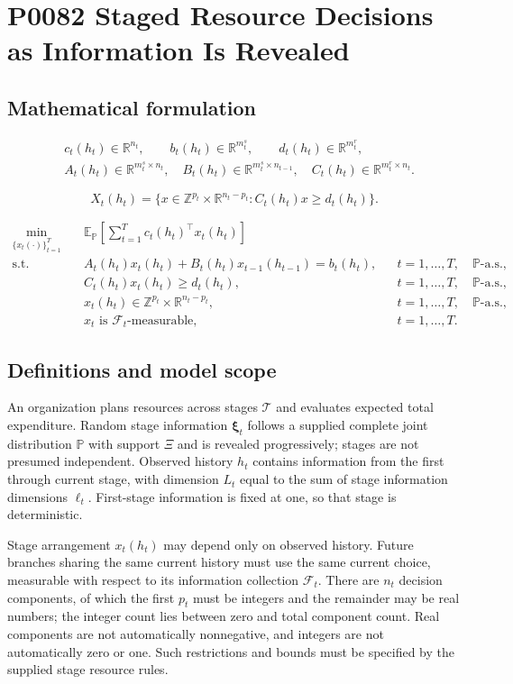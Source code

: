 \documentclass[10pt]{article}
\begin{document}
\section*{P0082 Staged Resource Decisions as Information Is Revealed}
\subsection*{Mathematical formulation}
\[
\begin{aligned}
&c_t(h_t)\in\mathbb R^{n_t},\qquad b_t(h_t)\in\mathbb R^{m_t^s},
\qquad d_t(h_t)\in\mathbb R^{m_t^r},\\
&A_t(h_t)\in\mathbb R^{m_t^s\times n_t},\quad
B_t(h_t)\in\mathbb R^{m_t^s\times n_{t-1}},\quad
C_t(h_t)\in\mathbb R^{m_t^r\times n_t}.
\end{aligned}
\]

\[
X_t(h_t)=\{x\in\mathbb Z^{p_t}\times\mathbb R^{n_t-p_t}:
 C_t(h_t)x\ge d_t(h_t)\}.
\]

\begin{align}
\min_{\{x_t(\cdot)\}_{t=1}^T}\quad&
\mathbb E_{\mathbb P}\!\left[\sum_{t=1}^T c_t(h_t)^\top x_t(h_t)\right]
\tag{1a}\\
\text{s.t.}\quad& A_t(h_t)x_t(h_t)+B_t(h_t)x_{t-1}(h_{t-1})=b_t(h_t),
&&t=1,\ldots,T,\quad\mathbb P\text{-a.s.},\tag{1b}\\
&C_t(h_t)x_t(h_t)\ge d_t(h_t),
&&t=1,\ldots,T,\quad\mathbb P\text{-a.s.},\tag{1c-i}\\
&x_t(h_t)\in\mathbb Z^{p_t}\times\mathbb R^{n_t-p_t},
&&t=1,\ldots,T,\quad\mathbb P\text{-a.s.},\tag{1c-ii}\\
&x_t\text{ is }\mathcal F_t\text{-measurable},
&&t=1,\ldots,T.\tag{NA}
\end{align}

\subsection*{Definitions and model scope}
An organization plans resources across stages $\mathcal T$ and evaluates expected total expenditure. Random stage information $\boldsymbol\xi_t$ follows a supplied complete joint distribution $\mathbb P$ with support $\Xi$ and is revealed progressively; stages are not presumed independent. Observed history $h_t$ contains information from the first through current stage, with dimension $L_t$ equal to the sum of stage information dimensions $\ell_t$. First-stage information is fixed at one, so that stage is deterministic.

Stage arrangement $x_t(h_t)$ may depend only on observed history. Future branches sharing the same current history must use the same current choice, measurable with respect to its information collection $\mathcal F_t$. There are $n_t$ decision components, of which the first $p_t$ must be integers and the remainder may be real numbers; the integer count lies between zero and total component count. Real components are not automatically nonnegative, and integers are not automatically zero or one. Such restrictions and bounds must be specified by the supplied stage resource rules.
\end{document}
